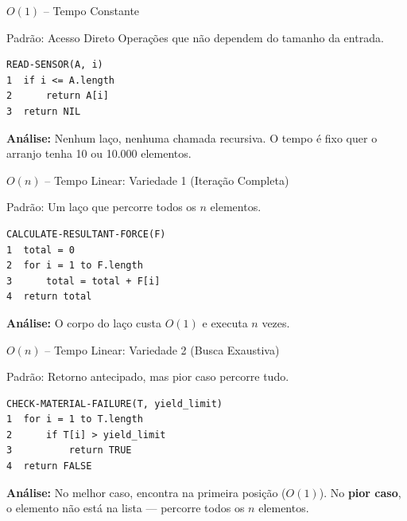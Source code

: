 \documentclass[aspectratio=169]{beamer}
\begin{document}
\begin{frame}{$O(1)$ -- Tempo Constante}
    \begin{block}{Padrão: Acesso Direto}
        Operações que não dependem do tamanho da entrada.
    \end{block}
\begin{verbatim}
READ-SENSOR(A, i)
1  if i <= A.length
2      return A[i]
3  return NIL
\end{verbatim}
    \textbf{Análise:} Nenhum laço, nenhuma chamada recursiva. O tempo é fixo quer o arranjo tenha 10 ou 10.000 elementos.
    
    \vspace{0.2cm}
    \hfill{}
\end{frame}

\begin{frame}{$O(n)$ -- Tempo Linear: Variedade 1 (Iteração Completa)}
    \begin{block}{Padrão: Um laço que percorre todos os $n$ elementos.}
    \end{block}
\begin{verbatim}
CALCULATE-RESULTANT-FORCE(F)
1  total = 0
2  for i = 1 to F.length
3      total = total + F[i]
4  return total
\end{verbatim}
    \textbf{Análise:} O corpo do laço custa $O(1)$ e executa $n$ vezes.
    
    \vspace{0.2cm}
    \hfill{}
\end{frame}

\begin{frame}{$O(n)$ -- Tempo Linear: Variedade 2 (Busca Exaustiva)}
    \begin{block}{Padrão: Retorno antecipado, mas pior caso percorre tudo.}
    \end{block}
\begin{verbatim}
CHECK-MATERIAL-FAILURE(T, yield_limit)
1  for i = 1 to T.length
2      if T[i] > yield_limit
3          return TRUE
4  return FALSE
\end{verbatim}
    \textbf{Análise:} No melhor caso, encontra na primeira posição ($O(1)$). No \textbf{pior caso}, o elemento não está na lista --- percorre todos os $n$ elementos.
    
    \vspace{0.2cm}
    \hfill{}
\end{frame}
\end{document}

